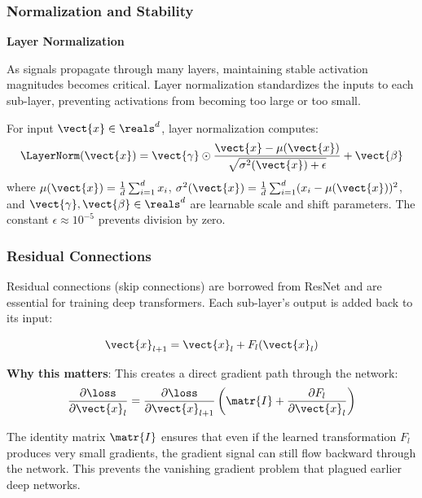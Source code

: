 \subsubsection{Normalization and Stability}

\textbf{Layer Normalization}

As signals propagate through many layers, maintaining stable activation magnitudes becomes critical. Layer normalization standardizes the inputs to each sub-layer, preventing activations from becoming too large or too small.

\begin{definition}
  For input $\vect{x} \in \reals^d$, layer normalization computes:
  \begin{equation}
    \LayerNorm(\vect{x}) = \vect{\gamma} \odot \frac{\vect{x} - \mu(\vect{x})}{\sqrt{\sigma^2(\vect{x}) + \epsilon}} + \vect{\beta}
  \end{equation}
  where $\mu(\vect{x}) = \frac{1}{d}\sum_{i=1}^d x_i$, $\sigma^2(\vect{x}) = \frac{1}{d}\sum_{i=1}^d (x_i - \mu(\vect{x}))^2$, and $\vect{\gamma}, \vect{\beta} \in \reals^d$ are learnable scale and shift parameters. The constant $\epsilon \approx 10^{-5}$ prevents division by zero.
\end{definition}

\subsubsection{Residual Connections}

Residual connections (skip connections) are borrowed from ResNet \cite{He2016} and are essential for training deep transformers. Each sub-layer's output is added back to its input:

\begin{equation}
  \vect{x}_{l+1} = \vect{x}_l + F_l(\vect{x}_l)
\end{equation}

\textbf{Why this matters}: This creates a direct gradient path through the network:
\begin{equation}
  \frac{\partial \loss}{\partial \vect{x}_l} = \frac{\partial \loss}{\partial \vect{x}_{l+1}}\left(\matr{I} + \frac{\partial F_l}{\partial \vect{x}_l}\right)
\end{equation}

The identity matrix $\matr{I}$ ensures that even if the learned transformation $F_l$ produces very small gradients, the gradient signal can still flow backward through the network. This prevents the vanishing gradient problem that plagued earlier deep networks.

